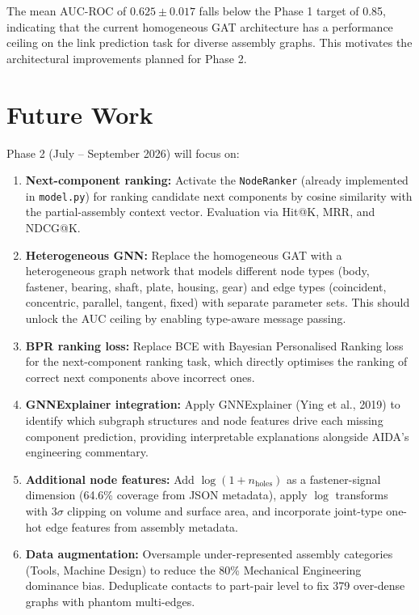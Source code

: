 \documentclass[12pt]{report}
\begin{document}
The mean AUC-ROC of $0.625 \pm 0.017$ falls below the Phase 1 target of 0.85, indicating that the current homogeneous GAT architecture has a performance ceiling on the link prediction task for diverse assembly graphs. This motivates the architectural improvements planned for Phase 2.

\section{Future Work}

Phase 2 (July -- September 2026) will focus on:

\begin{enumerate}
    \item \textbf{Next-component ranking:} Activate the \texttt{NodeRanker} (already implemented in \texttt{model.py}) for ranking candidate next components by cosine similarity with the partial-assembly context vector. Evaluation via Hit@K, MRR, and NDCG@K.

    \item \textbf{Heterogeneous GNN:} Replace the homogeneous GAT with a heterogeneous graph network that models different node types (body, fastener, bearing, shaft, plate, housing, gear) and edge types (coincident, concentric, parallel, tangent, fixed) with separate parameter sets. This should unlock the AUC ceiling by enabling type-aware message passing.

    \item \textbf{BPR ranking loss:} Replace BCE with Bayesian Personalised Ranking loss for the next-component ranking task, which directly optimises the ranking of correct next components above incorrect ones.

    \item \textbf{GNNExplainer integration:} Apply GNNExplainer (Ying et al., 2019) to identify which subgraph structures and node features drive each missing component prediction, providing interpretable explanations alongside AIDA's engineering commentary.

    \item \textbf{Additional node features:} Add $\log(1 + n_{\text{holes}})$ as a fastener-signal dimension (64.6\% coverage from JSON metadata), apply $\log$ transforms with $3\sigma$ clipping on volume and surface area, and incorporate joint-type one-hot edge features from assembly metadata.

    \item \textbf{Data augmentation:} Oversample under-represented assembly categories (Tools, Machine Design) to reduce the 80\% Mechanical Engineering dominance bias. Deduplicate contacts to part-pair level to fix 379 over-dense graphs with phantom multi-edges.
\end{enumerate}
\end{document}
